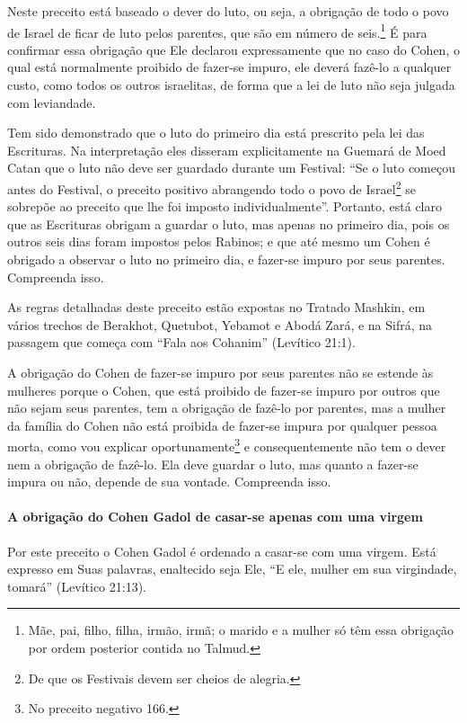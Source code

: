 Neste preceito está baseado o dever do luto, ou seja, a obrigação de
todo o povo de Israel de ficar de luto pelos parentes, que são em número
de seis.\footnote{Mãe, pai, filho, filha, irmão, irmã; o marido e a mulher só têm essa
  obrigação por ordem posterior contida no Talmud.} É para confirmar essa obrigação que Ele
declarou expressamente que no caso do Cohen, o qual está normalmente proibido de fazer-se impuro, ele deverá fazê-lo a qualquer custo, como todos os outros israelitas, de forma que a lei de luto não seja julgada com leviandade.

Tem sido demonstrado que o luto do primeiro dia está prescrito pela lei
das Escrituras. Na interpretação eles disseram explicitamente na Guemará
de Moed Catan que o luto não deve ser guardado durante um Festival: ``Se
o luto começou antes do Festival, o preceito positivo abrangendo todo o
povo de Israel\footnote{De que os Festivais devem ser cheios de alegria.} se sobrepõe ao preceito que lhe foi
imposto individualmente''. Portanto, está claro que as Escrituras obrigam a guardar o luto, mas apenas no primeiro dia, pois os outros seis dias foram impostos pelos Rabinos; e que
até mesmo um Cohen é obrigado a observar o luto no primeiro dia, e
fazer-se impuro por seus parentes. Compreenda isso.

As regras detalhadas deste preceito estão expostas no Tratado Mashkin, em vários trechos de Berakhot, Quetubot, Yebamot e Abodá Zará, e
na Sifrá, na passagem que começa com ``Fala aos Cohanim'' (Levítico
21:1).

A obrigação do Cohen de fazer-se impuro por seus parentes não se
estende às mulheres porque o Cohen, que está proibido de fazer-se
impuro por outros que não sejam seus parentes, tem a obrigação de
fazê-lo por parentes, mas a mulher da família do Cohen não está proibida de
fazer-se impura por qualquer pessoa morta, como vou explicar
oportunamente\footnote{No preceito negativo 166.} e consequentemente não tem o dever nem a obrigação de fazê-lo. Ela deve guardar
o luto, mas quanto a fazer-se impura ou não, depende de sua vontade.
Compreenda isso.

\paragraph{A obrigação do Cohen Gadol de casar-se apenas com uma virgem}

Por este preceito o Cohen Gadol é ordenado a casar-se com uma
virgem. Está expresso em Suas palavras, enaltecido seja Ele, ``E ele,
mulher em sua virgindade, tomará'' (Levítico 21:13).

